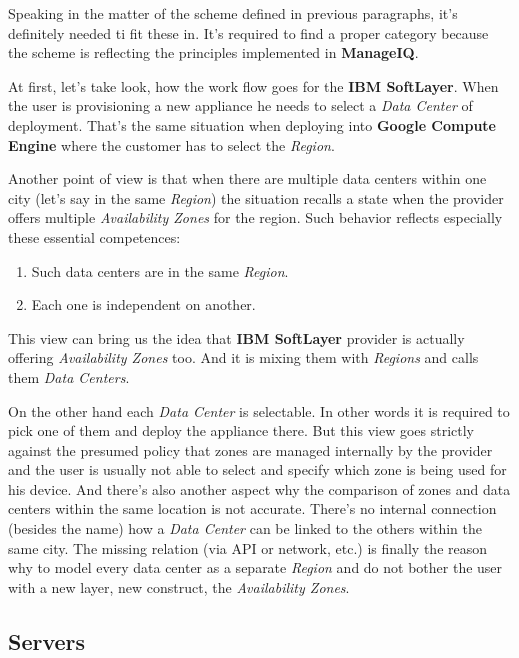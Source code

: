 Speaking in the matter of the scheme defined in previous paragraphs, it's definitely needed ti fit these in. It's required to find a proper category because the scheme is reflecting the principles implemented in \textbf{ManageIQ}.

At first, let's take look, how the work flow goes for the \textbf{IBM SoftLayer}. When the user is provisioning a new appliance he needs to select a \emph{Data Center} of deployment. That's the same situation when deploying into \textbf{Google Compute Engine} where the customer has to select the \emph{Region}.

Another point of view is that when there are multiple data centers within one city (let's say in the same \emph{Region}) the situation recalls a state when the provider offers multiple \emph{Availability Zones} for the region. Such behavior reflects especially these essential competences:

\begin{enumerate}
	\item Such data centers are in the same \emph{Region}.
	\item Each one is independent on another.
\end{enumerate}

This view can bring us the idea that \textbf{IBM SoftLayer} provider is actually offering \emph{Availability Zones} too. And it is mixing them with \emph{Regions} and calls them \emph{Data Centers}.

On the other hand each \emph{Data Center} is selectable. In other words it is required to pick one of them and deploy the appliance there. But this view goes strictly against the presumed policy that zones are managed internally by the provider and the user is usually not able to select and specify which zone is being used for his device. And there's also another aspect why the comparison of zones and data centers within the same location is not accurate. There's no internal connection (besides the name) how a \emph{Data Center} can be linked to the others within the same city. The missing relation (via API or network, etc.) is finally the reason why to model every data center as a separate \emph{Region} and do not bother the user with a new layer, new construct, the \emph{Availability Zones}.

\subsection{Servers}
\label{sub:Servers}

